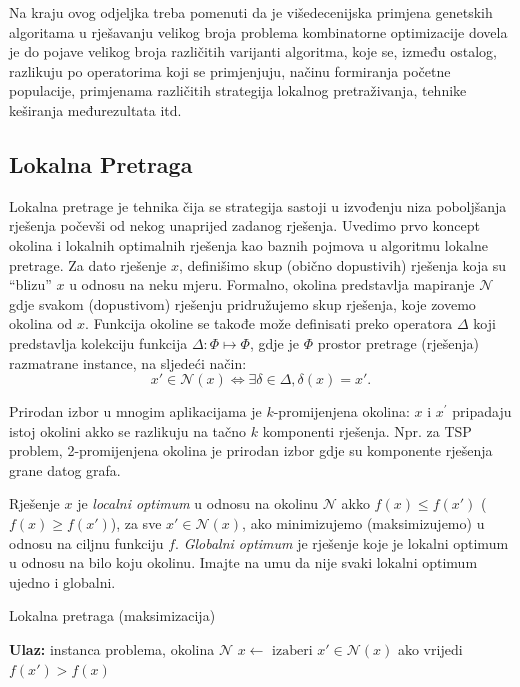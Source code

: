 \documentclass[a4paper, utf8, 11pt, colorlinks]{book}
\begin{document}
Na kraju ovog odjeljka treba pomenuti da je višedecenijska primjena genetskih algoritama u rješavanju velikog broja problema kombinatorne optimizacije dovela je do pojave velikog broja različitih varijanti algoritma, koje se, između ostalog, razlikuju po operatorima koji se primjenjuju, načinu formiranja početne populacije, primjenama različitih strategija lokalnog pretraživanja, tehnike keširanja međurezultata itd. 

 
\subsection{Lokalna Pretraga}\label{sec: local_search}

Lokalna pretrage je tehnika čija se strategija sastoji u izvođenju niza poboljšanja rješenja počevši od nekog unaprijed zadanog rješenja. Uvedimo prvo koncept okolina i lokalnih optimalnih rješenja kao baznih pojmova u algoritmu lokalne pretrage. Za dato rješenje $x$, definišimo skup (obično dopustivih) rješenja koja su ``blizu'' $x$ u odnosu na neku mjeru. Formalno, okolina predstavlja mapiranje  $\mathcal{N}$ gdje svakom (dopustivom) rješenju pridružujemo skup rješenja, koje zovemo okolina od $x$.  Funkcija okoline se takođe može definisati preko operatora  $\Delta$ koji predstavlja kolekciju   funkcija $\Delta:\Phi \mapsto \Phi$,  gdje je $\Phi$ prostor pretrage (rješenja) razmatrane instance, na sljedeći način:
$$ x' \in \mathcal{N}(x) \Longleftrightarrow \exists \delta \in \Delta,\delta(x)=x'.$$
 
Prirodan izbor u mnogim aplikacijama je $k$-promijenjena okolina: $x$ i $x^{'}$ pripadaju istoj okolini akko se razlikuju na tačno $k$ komponenti rješenja. Npr. za TSP problem, 2-promijenjena okolina je prirodan izbor gdje su komponente rješenja grane datog grafa.  

  
Rješenje $x$ je \emph{localni optimum} u odnosu na okolinu $\mathcal{N}$ akko
$f(x) \leq f(x')$ ($f(x) \geq f(x')$), za sve $x' \in \mathcal{N}(x)$, ako minimizujemo (maksimizujemo) u odnosu na ciljnu funkciju $f$.  \emph{Globalni optimum} je rješenje koje je lokalni optimum u odnosu na bilo koju okolinu.  Imajte na umu da nije svaki lokalni optimum ujedno i globalni. 

\begin{algorithm}[!t] 
	\caption{Lokalna pretraga (maksimizacija)}\label{alg:ls}
	\begin{algorithmic}[1]
		\STATE \textbf{Ulaz:} instanca problema, okolina $\mathcal{N}$
		\STATE $ x \gets  \text{ izaberi } x' \in \mathcal{N}(x) $ ako vrijedi  $f(x') > f(x)$ 
		\ENDWHILE
	\end{algorithmic}
\end{algorithm}
\end{document}
